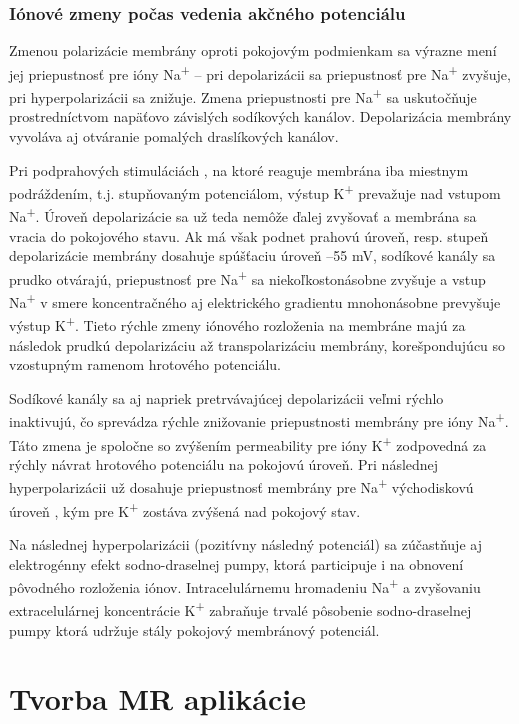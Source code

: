 \subsubsection{Iónové zmeny počas vedenia akčného potenciálu}

Zmenou polarizácie membrány oproti pokojovým podmienkam sa výrazne mení jej priepustnosť pre ióny Na\textsuperscript{+} {--} pri depolarizácii sa priepustnosť pre Na\textsuperscript{+} zvyšuje, 
pri hyperpolarizácii sa znižuje. Zmena priepustnosti pre Na\textsuperscript{+} sa uskutočňuje prostredníctvom napäťovo závislých sodíkových kanálov. Depolarizácia membrány vyvoláva aj 
otváranie pomalých draslíkových kanálov. 

Pri podprahových stimuláciách , na ktoré reaguje membrána iba miestnym podráždením, t.j. stupňovaným potenciálom, výstup K\textsuperscript{+} prevažuje nad vstupom Na\textsuperscript{+}. 
Úroveň depolarizácie sa už teda nemôže ďalej zvyšovať a membrána sa vracia do pokojového stavu. Ak má však podnet prahovú úroveň, resp. stupeň depolarizácie membrány dosahuje spúšťaciu úroveň
{--}55 mV, sodíkové kanály sa prudko otvárajú, priepustnosť pre Na\textsuperscript{+} sa niekoľkostonásobne zvyšuje a vstup Na\textsuperscript{+} v smere koncentračného aj elektrického gradientu
mnohonásobne prevyšuje výstup K\textsuperscript{+}. Tieto rýchle zmeny iónového rozloženia na membráne majú za následok prudkú depolarizáciu až transpolarizáciu membrány, korešpondujúcu so vzostupným
ramenom hrotového potenciálu.

Sodíkové kanály sa aj napriek pretrvávajúcej depolarizácii veľmi rýchlo inaktivujú, čo sprevádza rýchle znižovanie priepustnosti membrány pre ióny Na\textsuperscript{+}. Táto zmena je spoločne 
so zvýšením permeability pre ióny K\textsuperscript{+} zodpovedná za rýchly návrat hrotového potenciálu na pokojovú úroveň. Pri následnej hyperpolarizácii už dosahuje priepustnosť membrány pre 
Na\textsuperscript{+} východiskovú úroveň , kým pre K\textsuperscript{+} zostáva zvýšená nad pokojový stav.

Na následnej hyperpolarizácii (pozitívny následný potenciál) sa zúčastňuje aj elektrogénny efekt sodno-draselnej pumpy, ktorá participuje i na obnovení pôvodného rozloženia iónov.
Intracelulárnemu hromadeniu Na\textsuperscript{+} a zvyšovaniu extracelulárnej koncentrácie K\textsuperscript{+} zabraňuje trvalé pôsobenie sodno-draselnej pumpy ktorá udržuje stály pokojový 
membránový potenciál. \cite{javorkaLekarskaFyziologiaUcebnica2001}

\section{Tvorba MR aplikácie}


